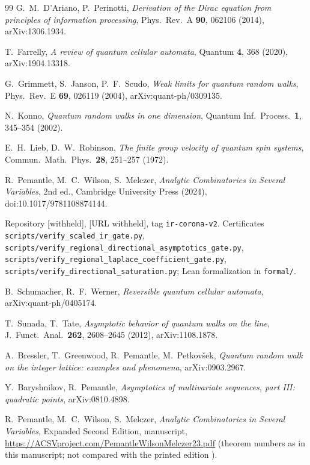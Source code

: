 \documentclass[11pt]{amsart}
\theoremstyle{definition}
\theoremstyle{remark}
\begin{document}
\begin{thebibliography}{99}
G.~M.~D'Ariano, P.~Perinotti,
\emph{Derivation of the Dirac equation from principles of information processing},
Phys.\ Rev.\ A \textbf{90}, 062106 (2014), arXiv:1306.1934.

T.~Farrelly,
\emph{A review of quantum cellular automata},
Quantum \textbf{4}, 368 (2020), arXiv:1904.13318.

G.~Grimmett, S.~Janson, P.~F.~Scudo,
\emph{Weak limits for quantum random walks},
Phys.\ Rev.\ E \textbf{69}, 026119 (2004), arXiv:quant-ph/0309135.

N.~Konno,
\emph{Quantum random walks in one dimension},
Quantum Inf.\ Process.\ \textbf{1}, 345--354 (2002).

E.~H.~Lieb, D.~W.~Robinson,
\emph{The finite group velocity of quantum spin systems},
Commun.\ Math.\ Phys.\ \textbf{28}, 251--257 (1972).

R.~Pemantle, M.~C.~Wilson, S.~Melczer,
\emph{Analytic Combinatorics in Several Variables}, 2nd ed.,
Cambridge University Press (2024), doi:10.1017/9781108874144.

Repository [withheld],
[URL withheld], tag
\texttt{ir-corona-v2}.
Certificates
\texttt{scripts/verify\_scaled\_ir\_gate.py},
\texttt{scripts/verify\_regional\_directional\_asymptotics\_gate.py},
\texttt{scripts/verify\_regional\_laplace\_coefficient\_gate.py},
\texttt{scripts/verify\_directional\_saturation.py}; Lean formalization in
\texttt{formal/}.

B.~Schumacher, R.~F.~Werner,
\emph{Reversible quantum cellular automata},
arXiv:quant-ph/0405174.

T.~Sunada, T.~Tate,
\emph{Asymptotic behavior of quantum walks on the line},
J.\ Funct.\ Anal.\ \textbf{262}, 2608--2645 (2012), arXiv:1108.1878.

A.~Bressler, T.~Greenwood, R.~Pemantle, M.~Petkov\v{s}ek,
\emph{Quantum random walk on the integer lattice: examples and phenomena},
arXiv:0903.2967.

Y.~Baryshnikov, R.~Pemantle,
\emph{Asymptotics of multivariate sequences, part III: quadratic points},
arXiv:0810.4898.

R.~Pemantle, M.~C.~Wilson, S.~Melczer,
\emph{Analytic Combinatorics in Several Variables}, Expanded Second Edition,
manuscript, \url{https://ACSVproject.com/PemantleWilsonMelczer23.pdf}
(theorem numbers as in this manuscript; not compared with the printed
edition \cite{ACSV}).

\end{thebibliography}
\end{document}
